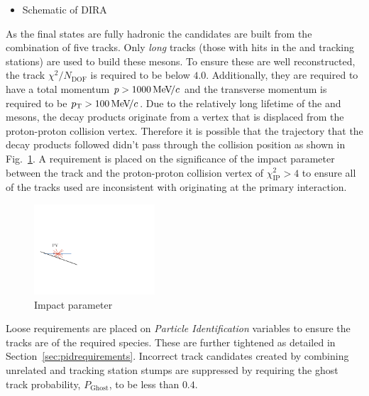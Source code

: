{\color{Green}
\begin{itemize}
\item Schematic of DIRA
\end{itemize}
}


As the final states are fully hadronic the candidates are built from the combination of five tracks. Only \emph{long} tracks (those with hits in the \velo and tracking stations) are used to build these mesons. To ensure these are well reconstructed, the track $\chi^{2}/N_{\text{DOF}}$ is required to be below $4.0$. Additionally, they are required to have a total momentum $\mbox{$p$} > 1000 {\mathrm{\,Me\kern -0.1em V\!/}c}$ and the transverse momentum is required to be $\mbox{$p_{\mathrm{ T}}$} > 100 {\mathrm{\,Me\kern -0.1em V\!/}c}$.
Due to the relatively long lifetime of the \Bp and \D mesons, the decay products originate from a vertex that is displaced from the proton-proton collision vertex. Therefore it is possible that the trajectory that the decay products followed didn't pass through the collision position as shown in Fig.~\ref{fig:impact_parameter}. A requirement is placed on the significance of the impact parameter between the track and the proton-proton collision vertex of $\chi^{2}_{\text{IP}} > 4$ to ensure all of the tracks used are inconsistent with originating at the primary interaction.  
\begin{figure}[!h]
    \centering
    \includegraphics[width=0.4\textwidth]{figs/Selection/Impact_parameter.pdf}
    \caption{Impact parameter}
    \label{fig:impact_parameter}   
\end{figure}

Loose requirements are placed on \emph{Particle Identification} variables to ensure the tracks are of the required species. These are further tightened as detailed in Section~\ref{sec:pidrequirements}. Incorrect track candidates created by combining unrelated \velo and tracking station stumps are suppressed by requiring the ghost track probability, $P_{\text{Ghost}}$, to be less than $0.4$. 


